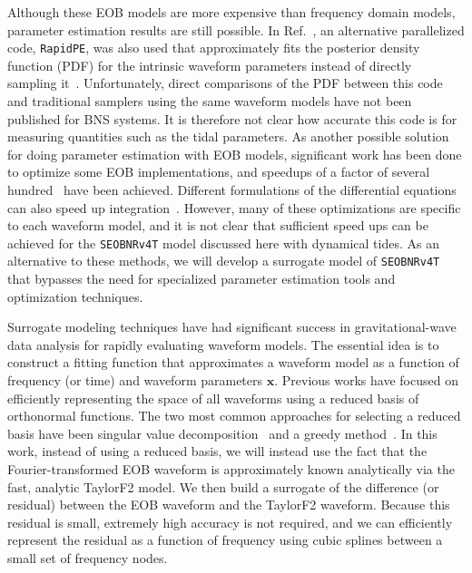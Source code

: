 \documentclass[prd,aps,letter,twocolumn,floatfix,notitlepage,nofootinbib]{revtex4-1}
\def\bx{\mathbf{x}}
\begin{document}
Although these EOB models are more expensive than frequency domain models, parameter estimation results are still possible. In Ref.~\cite{BNSPE}, an alternative parallelized code, \texttt{RapidPE}, was also used that approximately fits the posterior density function (PDF) for the intrinsic waveform parameters instead of directly sampling it~\cite{PankowBradyOchsner2015, LangeOshaughnessyRizzo2018}. Unfortunately, direct comparisons of the PDF between this code and traditional samplers using the same waveform models have not been published for BNS systems. It is therefore not clear how accurate this code is for measuring quantities such as the tidal parameters. As another possible solution for doing parameter estimation with EOB models, significant work has been done to optimize some EOB implementations, and speedups of a factor of several hundred~\cite{DevineEtienneMcWilliams2016} have been achieved. Different formulations of the differential equations can also speed up integration~\cite{NagarNettegno2018}. However, many of these optimizations are specific to each waveform model, and it is not clear that sufficient speed ups can be achieved for the \texttt{SEOBNRv4T} model discussed here with dynamical tides. As an alternative to these methods, we will develop a surrogate model of \texttt{SEOBNRv4T} that bypasses the need for specialized parameter estimation tools and optimization techniques. 

Surrogate modeling techniques have had significant success in gravitational-wave data analysis for rapidly evaluating waveform models. The essential idea is to construct a fitting function that approximates a waveform model as a function of frequency (or time) and waveform parameters $\bx$. Previous works have focused on efficiently representing the space of all waveforms using a reduced basis of orthonormal functions. The two most common approaches for selecting a reduced basis have been singular value decomposition~\cite{Puerrer2014, Puerrer2015} and a greedy method~\cite{FieldGalleyHesthaven2014, LackeyBernuzziGalley2017, BlackmanFieldGalley2015, BlackmanFieldScheel2017a, BlackmanFieldScheel2017b}. In this work, instead of using a reduced basis, we will instead use the fact that the Fourier-transformed EOB waveform is approximately known analytically via the fast, analytic TaylorF2 model. We then build a surrogate of the difference (or residual) between the EOB waveform and the TaylorF2 waveform. Because this residual is small, extremely high accuracy is not required, and we can efficiently represent the residual as a function of frequency using cubic splines between a small set of frequency nodes.
\end{document}
